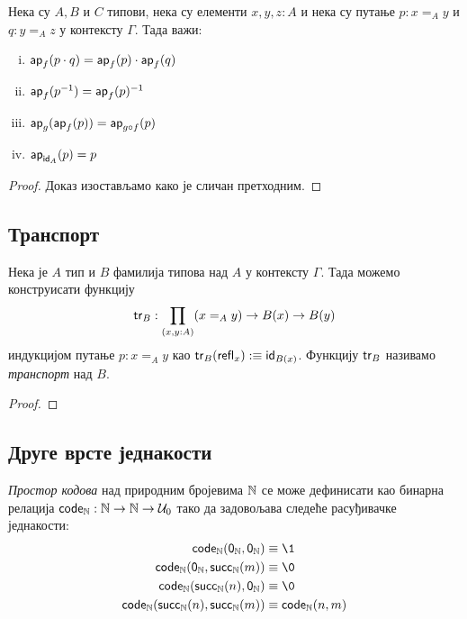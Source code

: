 \documentclass[12pt,oneside]{memoir}
\begin{document}
\begin{lemma}
    Нека су $A, B$ и $C$ типови, нека су елементи $x, y, z : A$ и нека су путање $p : x =_A y$ и $q : y =_A z$ у контексту $\Gamma$. Тада важи:
    \begin{enumerate}[(i)]
        \item $\mathsf{ap}_{f} (p \cdot q) = \mathsf{ap}_{f}(p) \cdot \mathsf{ap}_{f}(q)$
        \item $\mathsf{ap}_{f} (p^{-1}) = \mathsf{ap}_{f}(p)^{-1}$
        \item $\mathsf{ap}_{g} (\mathsf{ap}_{f} (p)) = \mathsf{ap}_{g \circ f} (p)$
        \item $\mathsf{ap}_{\mathsf{id}_{A}} (p) = p$
    \end{enumerate}
\end{lemma}
\begin{proof}
    Доказ изостављамо како је сличан претходним.
\end{proof}

\subsection{Транспорт}

\begin{lemma}
    Нека је $A$ тип и $B$ фамилија типова над $A$ у контексту $\Gamma$. Тада можемо конструисати функцију
    \[\mathsf{tr}_{B} : \prod_{(x,y:A)} (x =_{A} y) \to B(x) \to B(y)\]
    индукцијом путање $p : x =_{A} y$ као $\mathsf{tr}_{B}(\mathsf{refl}_{x}) :\equiv \mathsf{id}_{B(x)}$.
Функцију $\mathsf{tr}_{B}$ називамо \emph{транспорт} над $B$.
\end{lemma}
\begin{proof}
    
\end{proof}

\subsection{Друге врсте једнакости}

\begin{definition}
    \label{def:code}
    {\color{red}\emph{Простор кодова}} над природним бројевима ${\mathbb{N}}$ се може дефинисати као бинарна релација $\mathsf{code}_{{\mathbb{N}}} : {\mathbb{N}} \to {\mathbb{N}} \to \mathcal{U}_0$ тако да задовољава следеће расуђивачке једнакости:
    \begin{align*}
        \code{\N} (\zeroN, \zeroN) &\equiv\1 \\
        \code{\N} (\zeroN, \succN(m)) &\equiv\0 \\
        \code{\N} (\succN(n), \zeroN) &\equiv\0 \\
        \code{\N} (\succN(n), \succN(m)) &\equiv\code{\N} (n, m) \\
    \end{align*}
\end{definition}
\end{document}
